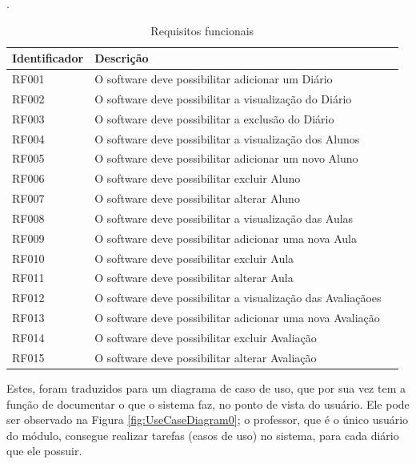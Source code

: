 \begin{table}[h]
	
	\vspace{0.5cm}.
	\centering
	\begin{tabular}{lll}
		\hline	
		Identificador & Descrição \\
		\hline
		RF001 &	O software deve possibilitar adicionar um Diário \\
		RF002 &	O software deve possibilitar a visualização do Diário \\
		RF003 &	O software deve possibilitar a exclusão do Diário \\
		
		RF004 &	O software deve possibilitar a visualização dos Alunos\\
		RF005 &	O software deve possibilitar adicionar um novo Aluno\\
		RF006 &	O software deve possibilitar excluir Aluno\\
		RF007 &	O software deve possibilitar alterar Aluno\\
		
		RF008 &	O software deve possibilitar a visualização das Aulas\\
		RF009 &	O software deve possibilitar adicionar uma nova Aula\\
		RF010 &	O software deve possibilitar excluir Aula\\
		RF011 &	O software deve possibilitar alterar Aula\\
		
		RF012 &	O software deve possibilitar a visualização das Avaliaçãoes\\
		RF013 &	O software deve possibilitar adicionar uma nova Avaliação\\
		RF014 &	O software deve possibilitar excluir Avaliação\\
		RF015 &	O software deve possibilitar alterar Avaliação \\
		
		\hline
	\end{tabular}
	\caption{Requisitos funcionais}
	\label{tab:reqfuncionais}
\end{table}

Estes, foram traduzidos para um diagrama de caso de uso, que por sua vez tem a função de documentar o que o sistema faz, no ponto de vista do usuário. Ele pode ser observado na Figura \ref{fig:UseCaseDiagram0}; o professor, que é o único usuário do módulo, consegue realizar tarefas (casos de uso) no sistema, para cada diário que ele possuir.

